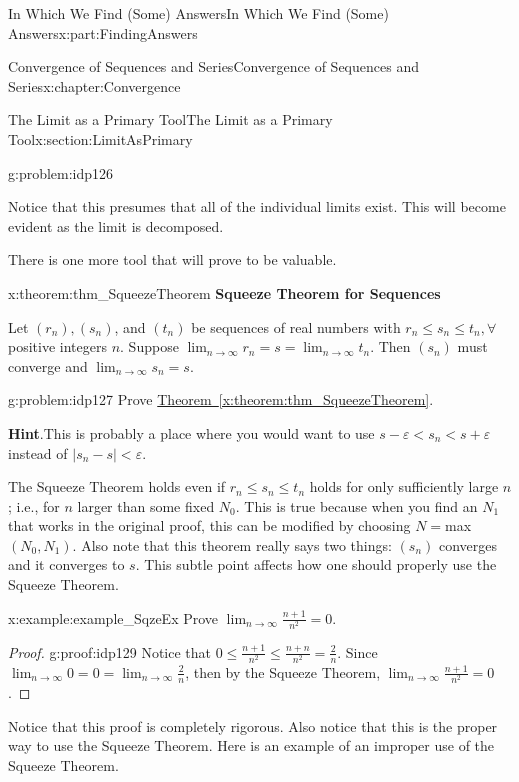 \documentclass[oneside,10pt,]{book}
\newcommand{\blocktitlefont}{\relax}
\newcommand{\xreffont}{\relax}
\newcommand{\terminology}[1]{\textbf{#1}}
\numberwithin{equation}{section}
\newcommand{\eps}{\varepsilon}
\newcommand{\lt}{<}
\begin{document}
\begin{partptx}{In Which We Find (Some) Answers}{}{In Which We Find (Some) Answers}{}{}{x:part:FindingAnswers}
\begin{chapterptx}{Convergence of Sequences and Series}{}{Convergence of Sequences and Series}{}{}{x:chapter:Convergence}
\begin{sectionptx}{The Limit as a Primary Tool}{}{The Limit as a Primary Tool}{}{}{x:section:LimitAsPrimary}
\begin{problem}{}{g:problem:idp126}
%
\par
Notice that this presumes that all of the individual limits exist. This will become evident as the limit is decomposed.%
\end{problem}
There is one more tool that will prove to be valuable.%
\begin{theorem}{}{}{x:theorem:thm_SqueezeTheorem}%
%
\terminology{Squeeze Theorem for Sequences}%
\par
Let \(\left(r_n\right),\left(s_n\right)\), and \(\left(t_n\right)\) be sequences of real numbers with \(r_n\leq s_n\leq t_n,\forall\) positive integers \(n\). Suppose \(\lim_{n\rightarrow\infty}r_n=s=\lim_{n\rightarrow\infty}t_n\). Then \(\left(s_n\right)\) must converge and \(\lim_{n\rightarrow\infty}s_n=s\).%
\end{theorem}
\begin{problem}{}{g:problem:idp127}%
Prove \hyperref[x:theorem:thm_SqueezeTheorem]{Theorem~{\xreffont\ref{x:theorem:thm_SqueezeTheorem}}}.%
\par\smallskip%
\noindent\textbf{\blocktitlefont Hint}.\hypertarget{g:hint:idp128}{}\quad{}This is probably a place where you would want to use \(s-\eps\lt s_n\lt s+\eps\) instead of \(|s_n-s|\lt
\eps\).%
\end{problem}
The Squeeze Theorem holds even if \(r_n\leq s_n\leq t_n\) holds for only sufficiently large \(n\); i.e., for \(n\) larger than some fixed \(N_0\). This is true because when you find an \(N_1\) that works in the original proof, this can be modified by choosing \(N=\)max\(\left(N_0,N_1\right)\). Also note that this theorem really says two things: \(\left(s_n\right)\) converges and it converges to \(s\). This subtle point affects how one should properly use the Squeeze Theorem.%
\begin{example}{}{x:example:example_SqzeEx}%
Prove \(\displaystyle\lim_{n\rightarrow\infty}\frac{n+1}{n^2}=0\).%
\end{example}
\begin{proof}{}{g:proof:idp129}
Notice that \(0\leq\frac{n+1}{n^2}\leq\frac{n+n}{n^2}=\frac{2}{n}\). Since \(\displaystyle\lim_{n\rightarrow\infty}0=0=\lim_{n\rightarrow\infty}\frac{2}{n}\), then by the Squeeze Theorem, \(\displaystyle\lim_{n\rightarrow\infty}\frac{n+1}{n^2}=0\).%
\end{proof}
Notice that this proof is completely rigorous. Also notice that this is the proper way to use the Squeeze Theorem. Here is an example of an \textbraceleft{}improper\textbraceright{} use of the Squeeze Theorem.%

\end{sectionptx}
\end{chapterptx}
\end{partptx}
\end{document}
